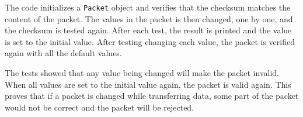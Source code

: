 The code initializes a \texttt{Packet} object and verifies that the checksum matches the content of the packet. The values in the packet is then changed, one by one, and the checksum is tested again. After each test, the result is printed and the value is set to the initial value. After testing changing each value, the packet is verified again with all the default values.

The tests showed that any value being changed will make the packet invalid. When all values are set to the initial value again, the packet is valid again.
This proves that if a packet is changed while transferring data, some part of the packet would not be correct and the packet will be rejected.
